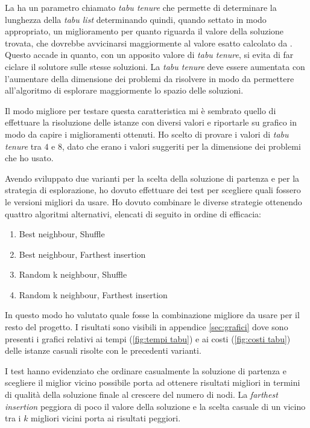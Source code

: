 La \tabu ha un parametro chiamato \emph{tabu tenure} che permette di determinare la lunghezza della \emph{tabu list} determinando quindi, quando settato in modo appropriato, un miglioramento per quanto riguarda il valore della soluzione trovata, che dovrebbe avvicinarsi maggiormente al valore esatto calcolato da .
Questo accade in quanto, con un apposito valore di \emph{tabu tenure}, si evita di far ciclare il solutore sulle stesse soluzioni.
La \emph{tabu tenure} deve essere aumentata con l'aumentare della dimensione dei problemi da risolvere in modo da permettere all'algoritmo di esplorare maggiormente lo spazio delle soluzioni.

Il modo migliore per testare questa caratteristica mi è sembrato quello di effettuare la risoluzione delle istanze con diversi valori e riportarle su grafico in modo da capire i miglioramenti ottenuti.
Ho scelto di provare i valori di \emph{tabu tenure} tra $4$ e $8$, dato che erano i valori suggeriti per la dimensione dei problemi che ho usato.

Avendo sviluppato due varianti per la scelta della soluzione di partenza e per la strategia di esplorazione, ho dovuto effettuare dei test per scegliere quali fossero le versioni migliori da usare.
Ho dovuto combinare le diverse strategie ottenendo quattro algoritmi alternativi, elencati di seguito in ordine di efficacia:
\begin{enumerate}
	\item Best neighbour, Shuffle
	\item Best neighbour, Farthest insertion 
	\item Random k neighbour, Shuffle
	\item Random k neighbour, Farthest insertion
\end{enumerate}
In questo modo ho valutato quale fosse la combinazione migliore da usare per il resto del progetto.
I risultati sono visibili in appendice \ref{sec:grafici} dove sono presenti i grafici relativi ai tempi (\ref{fig:tempi tabu}) e ai costi (\ref{fig:costi tabu}) delle istanze casuali risolte con le precedenti varianti.

I test hanno evidenziato che ordinare casualmente la soluzione di partenza e scegliere il miglior vicino possibile porta ad ottenere risultati migliori in termini di qualità della soluzione finale al crescere del numero di nodi.
La \emph{farthest insertion} peggiora di poco il valore della soluzione e la scelta casuale di un vicino tra i $k$ migliori vicini porta ai risultati peggiori.

